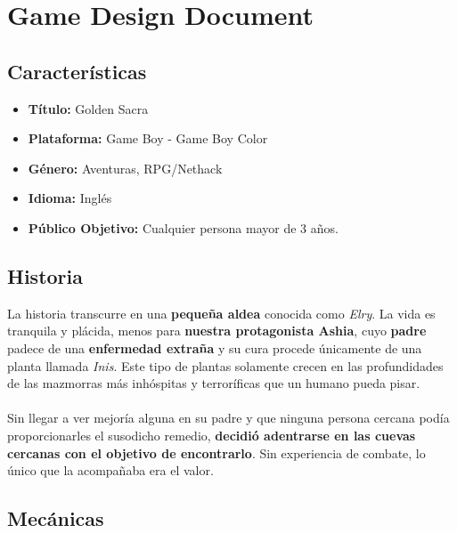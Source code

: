 \chapter{Game Design Document}
\label{gdd}

\section{Características}

\begin{itemize}
	\item \textbf{Título:} Golden Sacra
	\item \textbf{Plataforma:} Game Boy - Game Boy Color
	\item \textbf{Género:} Aventuras, RPG/Nethack
	\item \textbf{Idioma:} Inglés
	\item \textbf{Público Objetivo:} Cualquier persona mayor de 3 años.
\end{itemize}

\section{Historia}

La historia transcurre en una \textbf{pequeña aldea} conocida como \textit{Elry}. La vida es tranquila y plácida, menos para \textbf{nuestra protagonista Ashia}, cuyo \textbf{padre} padece de una \textbf{enfermedad extraña} y su cura procede únicamente de una planta llamada \textit{Inis}. Este tipo de plantas solamente crecen en las profundidades de las mazmorras más inhóspitas y terroríficas que un humano pueda pisar.
\\ \\
Sin llegar a ver mejoría alguna en su padre y que ninguna persona cercana podía proporcionarles el susodicho remedio, \textbf{decidió adentrarse en las cuevas cercanas con el objetivo de encontrarlo}. Sin experiencia de combate, lo único que la acompañaba era el valor.

\section{Mecánicas}

